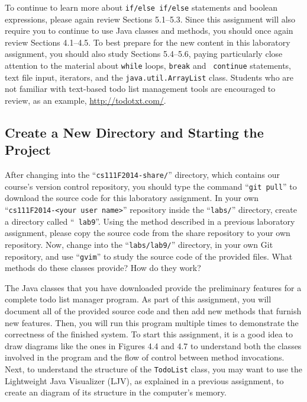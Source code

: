 To continue to learn more about {\tt if/else if/else} statements and boolean expressions, please again review Sections
5.1--5.3. Since this assignment will also require you to continue to use Java classes and methods, you should once again
review Sections 4.1--4.5.  To best prepare for the new content in this laboratory assignment, you should also study
Sections 5.4--5.6, paying particularly close attention to the material about {\tt while} loops, {\tt break} and {\tt
  continue} statements, text file input, iterators, and the {\tt java.util.ArrayList} class. Students who are not
familiar with text-based todo list management tools are encouraged to review, as an example, \url{http://todotxt.com/}.

\vspace{-0.1in}
\subsection*{Create a New Directory and Starting the Project}
\vspace{-0.05in}

After changing into the ``{\tt cs111F2014-share/}'' directory, which contains our course's version control repository,
you should type the command ``{\tt git pull}'' to download the source code for this laboratory assignment.  In your own
``{\tt cs111F2014-<your user name>}'' repository inside the ``{\tt labs/}'' directory, create a directory called ``{\tt
  lab9}''. Using the method described in a previous laboratory assignment, please copy the source code from the share
repository to your own repository. Now, change into the ``{\tt labs/lab9/}'' directory, in your own Git repository, and
use ``{\tt gvim}'' to study the source code of the provided files. What methods do these classes provide? How do they
work? 

The Java classes that you have downloaded provide the preliminary features for a complete todo list manager program. As
part of this assignment, you will document all of the provided source code and then add new methods that furnish new
features.  Then, you will run this program multiple times to demonstrate the correctness of the finished system. To
start this assignment, it is a good idea to draw diagrams like the ones in Figures 4.4 and 4.7 to understand both the
classes involved in the program and the flow of control between method invocations. Next, to understand the structure of
the {\tt TodoList} class, you may want to use the Lightweight Java Visualizer (LJV), as explained in a previous
assignment, to create an diagram of its structure in the computer's memory.

